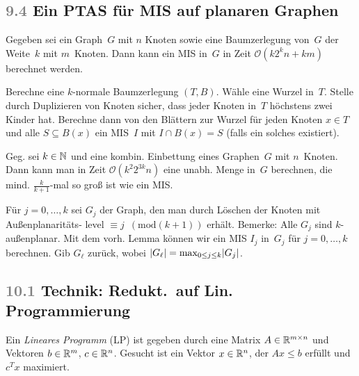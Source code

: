 \documentclass{cheat-sheet}
\newcommand{\size}[1]{\abs{#1}} %
\renewcommand{\O}{\mathcal{O}} %
\newcommand{\Problem}[1]{\textcolor{ProblemColor}{\textbf{#1}}}
\newcommand{\scriptSection}[1]{\textcolor{gray}{#1}\enspace}
\begin{document}
\subsection{\scriptSection{9.4} Ein PTAS für \Problem{MIS} auf planaren Graphen}

\begin{lem}
  Gegeben sei ein Graph~$G$ mit $n$ Knoten sowie eine Baumzerlegung von~$G$ der Weite~$k$ mit $m$~Knoten.
  Dann kann ein MIS in~$G$ in Zeit $\O(k 2^k n + k m)$ berechnet werden.
\end{lem}

\begin{beweisskizze}
  Berechne eine $k$-normale Baumzerlegung $(T, B)$.
  Wähle eine Wurzel in~$T$.
  Stelle durch Duplizieren von Knoten sicher, dass jeder Knoten in~$T$ höchstens zwei Kinder hat.
  Berechne dann von den Blättern zur Wurzel für jeden Knoten $x \in T$ und alle $S \subseteq B(x)$ ein MIS~$I$ mit $I \cap B(x) = S$ (falls ein solches existiert).
\end{beweisskizze}

\begin{satz}
  Geg. sei $k \in \mathbb{N}$ und eine kombin. Einbettung eines Graphen~$G$ mit $n$~Knoten.
  Dann kann man in Zeit $\O(k^2 2^{3k} n)$ eine unabh. Menge in~$G$ berechnen, die mind. $\tfrac{k}{k+1}$-mal so groß ist wie ein MIS.
\end{satz}

\begin{alg}
  Für $j = 0, \ldots, k$ sei $G_j$ der Graph, den man durch Löschen der Knoten mit Außenplanaritäts- level $\equiv j \enspace (\mathrm{mod } (k+1))$ erhält.
  Bemerke: Alle $G_j$ sind $k$-außenplanar.
  Mit dem vorh. Lemma können wir ein MIS $I_j$ in~$G_j$ für $j = 0, \ldots, k$ berechnen.
  Gib $G_\ell$ zurück, wobei $\size{G_\ell} = {\max}_{0 \leq j \leq k} \size{G_j}$.
\end{alg}

\subsection{\scriptSection{10.1} Technik: Redukt.\ auf Lin. Programmierung}


\begin{defn}
  Ein \emph{Lineares Programm} (LP) ist gegeben durch eine Matrix $A \in \mathbb{R}^{m \times n}$ und Vektoren $b \in \mathbb{R}^m$, $c \in \mathbb{R}^n$.
  Gesucht ist ein Vektor $x \in \mathbb{R}^n$, der $A x \leq b$ erfüllt und $c^T x$ maximiert.
\end{defn}
\end{document}
